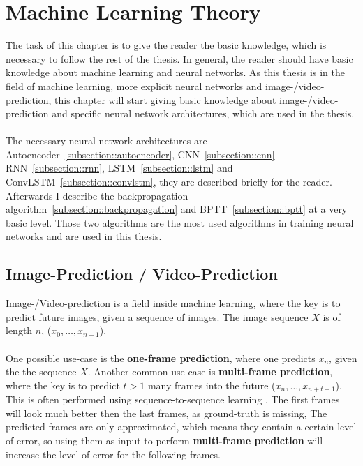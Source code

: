 \section{Machine Learning Theory} \label{section::theory}
 The task of this chapter is to give the reader the basic knowledge, which is necessary to follow the rest of the thesis. In general, the reader should have basic 
 knowledge about machine learning and neural networks.
 As this thesis is in the field of machine learning, more explicit neural networks and image-/video-prediction, this chapter will start giving basic knowledge about image-/video-prediction
 and specific neural network architectures, which are used in the thesis.\\\\
 The necessary neural network architectures are Autoencoder~\ref{subsection::autoencoder}, CNN~\ref{subsection::cnn} RNN~\ref{subsection::rnn}, 
 LSTM~\ref{subsection::lstm} and ConvLSTM~\ref{subsection::convlstm}, they are described briefly for the reader.
 Afterwards I describe the backpropagation algorithm~\ref{subsection::backpropagation} and BPTT~\ref{subsection::bptt} at a very basic level.
 Those two algorithms are the most used algorithms in training neural networks and are used in this thesis.

 \subsection{Image-Prediction / Video-Prediction} \label{subsection::imageprediction}
  Image-/Video-prediction is a field inside machine learning, where the key is to predict future images, given a sequence of images. The image sequence $X$ is of 
  length $n$, ($x_0, \ldots, x_{n-1}$).
  \\\\
  One possible use-case is the \textbf{one-frame prediction}, where one predicts $x_n$, given the the sequence $X$. Another common use-case is \textbf{multi-frame prediction}, where the key is to 
  predict $t > 1$ many frames into the future ($x_n, \ldots, x_{n+t-1}$).
  This is often performed using sequence-to-sequence learning \cite{Sutskever2014}. The first frames will look much better then the last frames, as 
  ground-truth is missing, The predicted frames are only approximated, which means they contain a certain level of error, so using them as input to perform \textbf{multi-frame prediction} will
  increase the level of error for the following frames.


